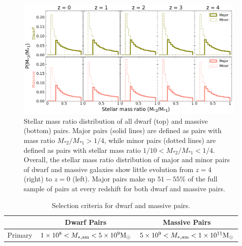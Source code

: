 \documentclass[twocolumn]{aastex631}
\newcommand{\ms}[1]{\ensuremath{M_{*{#1}}}}
\begin{document}
  \begin{figure}[htp]
    \centering
    \includegraphics[width=\textwidth]{smrdist_1000.png}
    \caption{Stellar mass ratio distribution of all dwarf (top) and massive (bottom) pairs. Major pairs (solid lines) are defined as pairs with mass ratio $\ms{2}/\ms{1} > 1/4$, while minor pairs (dotted lines) are defined as pairs with stellar mass ratio $1/10<\ms{2}/\ms{1}<1/4$. Overall, the stellar mass ratio distribution of major and minor pairs of dwarf and massive galaxies show little evolution from $z=4$ (right) to $z=0$ (left). 
    Major pairs make up $51-55\%$ of the full sample of pairs at every redshift for both dwarf and massive pairs.}
    \label{fig:massratio}
  \end{figure}
  
\begin{table}[htb]
  \centering
    \begin{tabular}{lcc}
     & Dwarf Pairs & Massive Pairs \\\hline\hline
    Primary &$1\times10^{8} < M_{*,\mathrm{am}} < 5\times10^{9} \mathrm{M}_\odot$ & $5\times10^{9} < M_{*,\mathrm{am}} < 1\times10^{11} \mathrm{M}_\odot$\\\hline
    \end{tabular}
    \caption{\label{table:mass}Selection criteria for dwarf and massive pairs.}
    \end{table}
\end{document}
